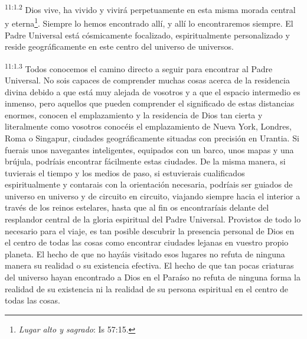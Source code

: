 \par
\textsuperscript{11:1.2} Dios vive, ha vivido y vivirá perpetuamente en esta misma morada central y eterna\footnote{\textit{Lugar alto y sagrado}: Is 57:15.}. Siempre lo hemos encontrado allí, y allí lo encontraremos siempre. El Padre Universal está cósmicamente focalizado, espiritualmente personalizado y reside geográficamente en este centro del universo de universos.

\par
\textsuperscript{11:1.3} Todos conocemos el camino directo a seguir para encontrar al Padre Universal. No sois capaces de comprender muchas cosas acerca de la residencia divina debido a que está muy alejada de vosotros y a que el espacio intermedio es inmenso, pero aquellos que pueden comprender el significado de estas distancias enormes, conocen el emplazamiento y la residencia de Dios tan cierta y literalmente como vosotros conocéis el emplazamiento de Nueva York, Londres, Roma o Singapur, ciudades geográficamente situadas con precisión en Urantia. Si fuerais unos navegantes inteligentes, equipados con un barco, unos mapas y una brújula, podríais encontrar fácilmente estas ciudades. De la misma manera, si tuvierais el tiempo y los medios de paso, si estuvierais cualificados espiritualmente y contarais con la orientación necesaria, podríais ser guiados de universo en universo y de circuito en circuito, viajando siempre hacia el interior a través de los reinos estelares, hasta que al fin os encontraríais delante del resplandor central de la gloria espiritual del Padre Universal. Provistos de todo lo necesario para el viaje, es tan posible descubrir la presencia personal de Dios en el centro de todas las cosas como encontrar ciudades lejanas en vuestro propio planeta. El hecho de que no hayáis visitado esos lugares no refuta de ninguna manera su realidad o su existencia efectiva. El hecho de que tan pocas criaturas del universo hayan encontrado a Dios en el Paraíso no refuta de ninguna forma la realidad de su existencia ni la realidad de su persona espiritual en el centro de todas las cosas.

